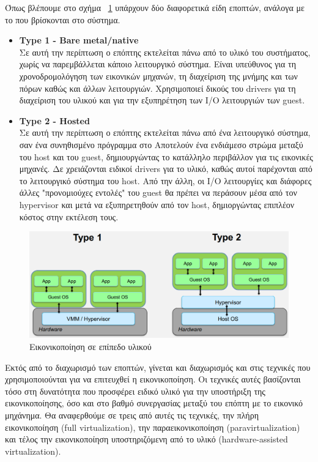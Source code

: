 Όπως βλέπουμε στο σχήμα ~\ref{fig3} υπάρχουν δύο διαφορετικά είδη εποπτών,
ανάλογα με το που βρίσκονται στο σύστημα. 
\begin{itemize}
	\item \textbf{Type 1 - Bare metal/native} \\
		Σε αυτή την περίπτωση ο επόπτης εκτελείται πάνω από το υλικό του
		συστήματος, χωρίς να παρεμβάλλεται κάποιο λειτουργικό σύστημα.
		Είναι υπεύθυνος για τη χρονοδρομολόγηση των εικονικών μηχανών,
		τη διαχείριση της μνήμης και των πόρων καθώς και άλλων
		λειτουργιών. Χρησιμοποιεί δικούς του drivers για τη διαχείριση
		του υλικού και για την εξυπηρέτηση των I/O λειτουργιών των
		guest. 
	\item \textbf{Type 2 - Hosted} \\
		Σε αυτή την περίπτωση ο επόπτης εκτελείται πάνω από ένα
		λειτουργικό σύστημα, σαν ένα συνηθισμένο πρόγραμμα στο
		 Αποτελούν ένα ενδιάμεσο στρώμα μεταξύ του host και
		του guest, δημιουργώντας το κατάλληλο περιβάλλον για τις
		εικονικές μηχανές. Δε χρειάζονται ειδικοί drivers για 
		το υλικό, καθώς αυτοί παρέχονται από το λειτουργικό σύστημα του
		host. Από την άλλη, οι I/O λειτουργίες και διάφορες άλλες
		"προνομιούχες εντολές" του guest θα πρέπει να
		περάσουν μέσα από τον hypervisor και μετά να εξυπηρετηθούν από
		τον host, δημιοργώντας επιπλέον κόστος στην εκτέλεση τους. 
\end{itemize}

\begin{figure}[htp]
\centering
	\includegraphics[scale=0.3]{figures/zcBClDR.png}
\caption{Εικονικοποίηση σε επίπεδο υλικού\label{fig3}}
\end{figure}

Εκτός από το διαχωρισμό των εποπτών, γίνεται και διαχωρισμός και στις τεχνικές
που χρησιμοποιούνται για να επιτευχθεί η εικονικοποίηση. Οι τεχνικές αυτές
βασίζονται τόσο στη δυνατότητα που προσφέρει ειδικό υλικό για την υποστήριξη της
εικονικοποίησης, όσο και στο βαθμό συνεργασίας μεταξύ του επόπτη με το εικονικό
μηχάνημα. Θα αναφερθούμε σε τρεις από αυτές τις τεχνικές, την πλήρη
εικονικοποίηση (full virtualization), την παραεικονικοποίηση
(paravirtualization) και τέλος την εικονικοποίηση υποστηριζόμενη από το υλικό
(hardware-assisted virtualization). 

